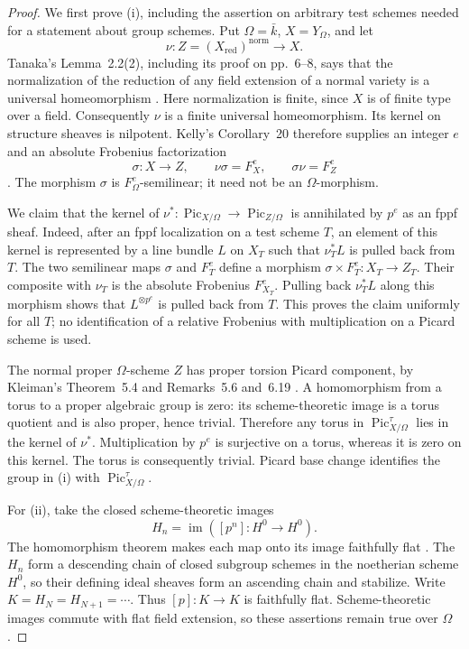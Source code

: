 \begin{proof}
We first prove (i), including the assertion on arbitrary test schemes
needed for a statement about group schemes.  Put $\Omega=\bar k$,
$X=Y_\Omega$, and let
\[
 \nu:Z=(X_{\mathrm{red}})^{\mathrm{norm}}\longrightarrow X.
\]
Tanaka's Lemma~2.2(2), including its proof on pp.~6--8, says that the
normalization of the reduction of any field extension of a normal
variety is a universal homeomorphism
\cite[Lemma 2.2(2)]{Tanaka2015D}.
Here normalization is finite, since $X$ is of finite type over a field.
Consequently $\nu$ is a finite universal homeomorphism.  Its kernel on
structure sheaves is nilpotent.  Kelly's Corollary~20 therefore supplies
an integer $e$ and an absolute Frobenius factorization
\[
 \sigma:X\longrightarrow Z,\qquad
 \nu\sigma=F_X^e,\qquad \sigma\nu=F_Z^e
\]
\cite[Corollary 20, p.~9]{Kelly2018D}.
The morphism $\sigma$ is $F_\Omega^e$-semilinear; it need not be an
$\Omega$-morphism.

We claim that the kernel of
$\nu^*:\operatorname{Pic}_{X/\Omega}\to
\operatorname{Pic}_{Z/\Omega}$ is annihilated by $p^e$ as an fppf
sheaf.  Indeed, after an fppf localization on a test scheme $T$, an
element of this kernel is represented by a line bundle $L$ on $X_T$
such that $\nu_T^*L$ is pulled back from $T$.  The two semilinear maps
$\sigma$ and $F_T^e$ define a morphism
$\sigma\times F_T^e:X_T\to Z_T$.  Their composite with $\nu_T$ is the
absolute Frobenius $F_{X_T}^e$.  Pulling back $\nu_T^*L$ along this
morphism shows that $L^{\otimes p^e}$ is pulled back from $T$.
This proves the claim uniformly for all $T$; no identification of a
relative Frobenius with multiplication on a Picard scheme is used.

The normal proper $\Omega$-scheme $Z$ has proper torsion Picard
component, by Kleiman's Theorem~5.4 and Remarks~5.6 and~6.19
\cite{Kleiman2005}.  A homomorphism from a torus to a proper algebraic
group is zero: its scheme-theoretic image is a torus quotient and is
also proper, hence trivial.  Therefore any torus in
$\operatorname{Pic}^{\tau}_{X/\Omega}$ lies in the kernel of $\nu^*$.
Multiplication by $p^e$ is surjective on a torus, whereas it is zero on
this kernel.  The torus is consequently trivial.  Picard base change
identifies the group in (i) with $\operatorname{Pic}^{\tau}_{X/\Omega}$.

For (ii), take the closed scheme-theoretic images
\[
 H_n=\operatorname{im}([p^n]:H^0\longrightarrow H^0).
\]
The homomorphism theorem makes each map onto its image faithfully
flat \cite[Theorem 5.39, p.~108]{MilneAG2022B}.  The $H_n$ form a
descending chain of closed subgroup schemes in the noetherian scheme
$H^0$, so their defining ideal sheaves form an ascending chain and
stabilize.  Write $K=H_N=H_{N+1}=\cdots$.  Thus
$[p]:K\to K$ is faithfully flat.  Scheme-theoretic images commute with
flat field extension, so these assertions remain true over $\Omega$.


\end{proof}
